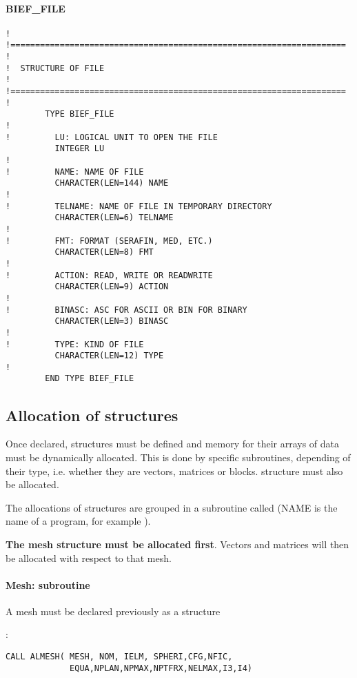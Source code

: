 \paragraph{BIEF\_FILE}

\begin{lstlisting}[language=TelFortran]
!
!====================================================================
!
!  STRUCTURE OF FILE
!
!====================================================================
!
        TYPE BIEF_FILE
!
!         LU: LOGICAL UNIT TO OPEN THE FILE
          INTEGER LU
!
!         NAME: NAME OF FILE
          CHARACTER(LEN=144) NAME
!
!         TELNAME: NAME OF FILE IN TEMPORARY DIRECTORY
          CHARACTER(LEN=6) TELNAME
!
!         FMT: FORMAT (SERAFIN, MED, ETC.)
          CHARACTER(LEN=8) FMT
!
!         ACTION: READ, WRITE OR READWRITE
          CHARACTER(LEN=9) ACTION
!
!         BINASC: ASC FOR ASCII OR BIN FOR BINARY
          CHARACTER(LEN=3) BINASC
!
!         TYPE: KIND OF FILE
          CHARACTER(LEN=12) TYPE
!
        END TYPE BIEF_FILE
\end{lstlisting}

\subsection{Allocation of structures}

Once declared,  structures must be defined and memory for
their arrays of data must be dynamically allocated. This is done by specific
subroutines, depending of their type, i.e. whether they are vectors, matrices
or blocks.  structure must also be allocated.

The allocations of structures are grouped in a subroutine called
 (NAME is the name of a \telemacsystem program, for example
\artemis).

\textbf{The mesh structure must be allocated first}. Vectors and matrices will
then be allocated with respect to that mesh.

\paragraph{Mesh: subroutine }

A mesh must be declared previously as a  structure

:
\begin{lstlisting}[language=TelFortran]
CALL ALMESH( MESH, NOM, IELM, SPHERI,CFG,NFIC,
             EQUA,NPLAN,NPMAX,NPTFRX,NELMAX,I3,I4)
\end{lstlisting}

